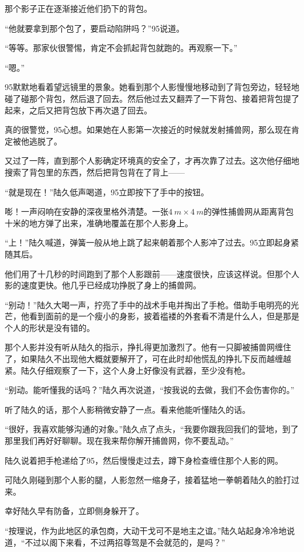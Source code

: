 那个影子正在逐渐接近他们扔下的背包。

“他就要拿到那个包了，要启动陷阱吗？”95说道。

“等等。那家伙很警惕，肯定不会抓起背包就跑的。再观察一下。”

“嗯。”

95默默地看着望远镜里的景象。她看到那个人影慢慢地移动到了背包旁边，轻轻地碰了碰那个背包，然后退了回去。然后他过去又翻弄了一下背包、接着把背包提了起来，之后又把背包放下再次退了回去。

真的很警觉，95心想。如果她在人影第一次接近的时候就发射捕兽网，那么现在肯定被他逃脱了。

又过了一阵，直到那个人影确定环境真的安全了，才再次靠了过去。这次他仔细地搜索了背包里的东西，然后把背包背在了背上——

“就是现在！”陆久低声喝道，95立即按下了手中的按钮。

嘭！一声闷响在安静的深夜里格外清楚。一张$\SI{4}{m}\times \SI{4}{m} $的弹性捕兽网从距离背包十米的地方弹了出来，准确地覆盖在那个人影身上。

“上！”陆久喊道，弹簧一般从地上跳了起来朝着那个人影冲了过去。95立即起身紧随其后。

他们用了十几秒的时间跑到了那个人影跟前——速度很快，应该这样说。但那个人影的速度更快。他几乎已经成功挣脱了身上的捕兽网。

“别动！”陆久大喝一声，拧亮了手中的战术手电并掏出了手枪。借助手电明亮的光芒，他看到面前的是一个瘦小的身影，披着褴褛的外套看不清是什么人，但是那是个人的形状是没有错的。

那个人影并没有听从陆久的指示，挣扎得更加激烈了。他有一只脚被捕兽网缠住了，如果陆久不出现他大概就要解开了，可在此时却他慌乱的挣扎下反而越缠越紧。陆久仔细观察了一下，这个人身上好像没有武器，至少没有枪。

“别动。能听懂我的话吗？”陆久再次说道，“按我说的去做，我们不会伤害你的。”

听了陆久的话，那个人影稍微安静了一点。看来他能听懂陆久的话。

“很好，我喜欢能够沟通的对象。”陆久点了点头，“我要你跟我回我们的营地，到了那里我们再好好聊聊。现在我来帮你解开捕兽网，你不要乱动。”

陆久说着把手枪递给了95，然后慢慢走过去，蹲下身检查缠住那个人影的网。

可陆久刚碰到那个人影的腿，人影忽然一缩身子，接着猛地一拳朝着陆久的脸打过来。

幸好陆久早有防备，立即侧身躲开了。

“按理说，作为此地区的承包商，大动干戈可不是地主之谊。”陆久站起身冷冷地说道，“不过以阁下来看，不过两招尊驾是不会就范的，是吗？”

